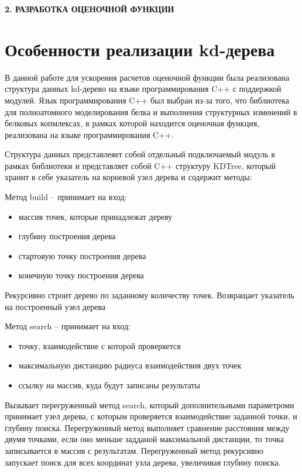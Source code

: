 \newpage
\begin{center}
	\textbf{\large 2. РАЗРАБОТКА ОЦЕНОЧНОЙ ФУНКЦИИ}
\end{center}


\section{Особенности реализации kd-дерева}


В данной работе для ускорения расчетов оценочной функции была реализована структура данных kd-дерево на языке программирования C++ с поддержкой модулей. Язык программирования C++ был выбран из-за того, что библиотека для полноатомного моделирования белка и выполнения структурных изменений в белковых копмлексах, в рамках которой находится оценочная функция, реализована на языке программирования C++.

Структура данных представлеяет собой отдельный подключаемый модуль в рамках библиотеки и представляет собой C++ структуру KDTree, который хранит в себе указатель на корневой узел дерева и содержит методы:

Метод build -- принимает на вход:

\begin{itemize}
	\item массив точек, которые принадлежат дереву
	\item глубину построения дерева
	\item стартовую точку построения дерева
	\item конечную точку построения дерева
\end{itemize}

Рекурсивно строит дерево по заданному количеству точек. Возвращает указатель на построенный узел дерева

Метод search -- принимает на вход:
\begin{itemize}
	\item точку, взаимодействие с которой проверяется
	\item максимальную дистанцию радиуса взаимодействия двух точек
	\item ссылку на массив, куда будут записаны результаты
\end{itemize}

Вызывает перегруженный метод search, который дополнительными параметроми принимает узел дерева, с которым проверяется взаимодействие заданной точки, и глубину поиска. Перегруженный метод выполняет сравнение расстояния между двумя точками, если оно меньше задданой максимальной дистанции, то точка записывается в массив с результатам. Перегруженный метод рекурсивно запускает поиск для всех координат узла дерева, увеличивая глубину поиска.



